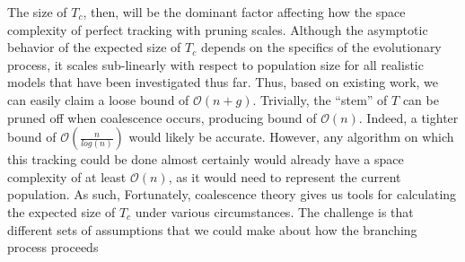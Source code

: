The size of $T_c$, then, will be the dominant factor affecting how the space complexity of perfect tracking with pruning scales.
Although the asymptotic behavior of the expected size of $T_c$ depends on the specifics of the evolutionary process, it scales sub-linearly with respect to population size for all realistic models that have been investigated thus far.
Thus, based on existing work, we can easily claim a loose bound of $\mathcal{O}(n + g)$.
Trivially, the ``stem'' of $T$ can be pruned off when coalescence occurs, producing bound of $\mathcal{O}(n)$.
Indeed, a tighter bound of $\mathcal{O}(\frac{n}{log(n)})$ would likely be accurate.
However, any algorithm on which this tracking could be done almost certainly would already have a space complexity of at least $\mathcal{O}(n)$, as it would need to represent the current population.
As such, 
Fortunately, coalescence theory gives us tools for calculating the expected size of $T_c$ under various circumstances.
The challenge is that different sets of assumptions that we could make about how the branching process proceeds 







